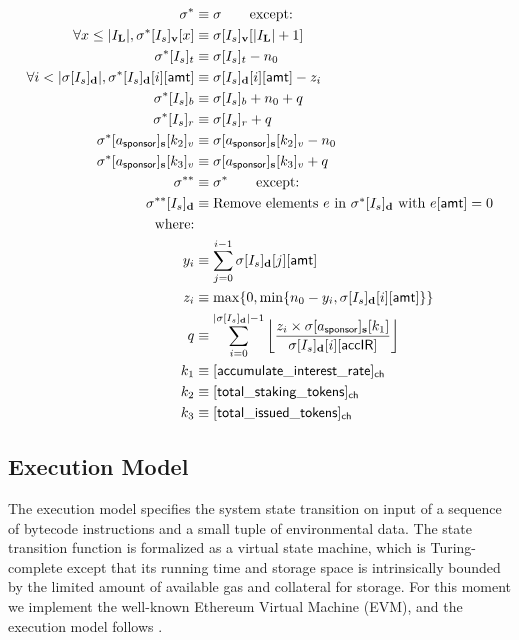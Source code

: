 \begin{itemize}
\begin{align}
		\st^{*} &\eqdef \st \qquad \mbox{except:}\\
		\forall x\le |I_\mathbf{L}|, \st^{*}[I_s]_{\bf v}[x] &\eqdef \st[I_s]_{\bf v}[|I_\mathbf{L}|+1]\\ 
		\st^{*}[I_s]_t &\eqdef \st[I_s]_t - n_0\\ 
		\forall i < |\st[I_s]_{\bf d}|, \st^{*}[I_s]_{\bf d}[i][{\sf amt}] &\eqdef \st[I_s]_{\bf d}[i][{\sf amt}] - z_i \\
		\st^{*}[I_s]_b &\eqdef \st[I_s]_b + n_0 + q\\
		\st^{*}[I_s]_r &\eqdef \st[I_s]_r + q\\
		\st^{*}[a_{\sf sponsor}]_{\bf s}[k_2]_v & \eqdef\st[a_{\sf sponsor}]_{\bf s}[k_2]_v - n_0 \\
		\st^{*}[a_{\sf sponsor}]_{\bf s}[k_3]_v & \eqdef\st[a_{\sf sponsor}]_{\bf s}[k_3]_v + q \\
		\st^{**} &\eqdef \st^* \qquad \mbox{except:}\\
		\st^{**}[I_s]_{\bf d} &\eqdef \mbox{Remove elements $e$ in $\st^{*}[I_s]_{\bf d}$ with $e[{\sf amt}]=0$} \\
		\mbox{where:}& \\
		y_i & \eqdef \sum_{j=0}^{i-1} \st[I_s]_{\bf d}[j][{\sf amt}] \\
		z_i & \eqdef \max\{0,\min\{n_0-y_i,\st[I_s]_{\bf d}[i][{\sf amt}]\}\} \\
		q & \eqdef \sum_{i=0}^{|\st[I_s]_{\bf d}|-1} \left\lfloor \frac{z_i \times \st[a_{\sf sponsor}]_{\bf s}[k_1]}{\st[I_s]_{\bf d}[i][{\sf accIR}]}\right\rfloor \\
		k_1 & \eqdef [{\sf accumulate\char`_interest\char`_rate}]_{\sf ch} \\
		k_2 & \eqdef [{\sf total\char`_staking\char`_tokens}]_{\sf ch} \\ 
		k_3 & \eqdef [{\sf total\char`_issued\char`_tokens}]_{\sf ch} \\ 
	\end{align}
\end{itemize}


\subsection{Execution Model}
\label{sec:exe model}

The execution model specifies the system state transition on input of a sequence of bytecode instructions and a small tuple of environmental data. 
The state transition function is formalized as a virtual state machine,
which 
is Turing-complete except that its running time and storage space is intrinsically bounded by the limited amount of available gas and collateral for storage.
% 
For this moment we implement the well-known Ethereum Virtual Machine (EVM), and the execution model follows \cite{ETH_yellow}.


